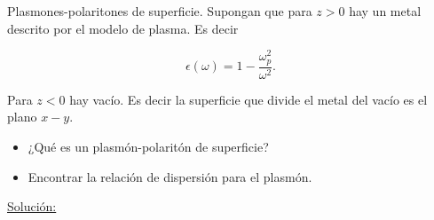 \documentclass[a4paper,11pt]{article}
\numberwithin{equation}{section}
\begin{document}
Plasmones-polaritones de superficie. Supongan que para $z > 0$ hay un metal descrito por el modelo de plasma. Es decir 

$$
\epsilon(\omega) = 1 - \frac{\omega_p^2}{\omega^2}.
$$

Para $z < 0$ hay vacío. Es decir la superficie que divide el metal del vacío es el plano $x - y$.

\begin{itemize}
 \item ¿Qué es un plasmón-polaritón de superficie?
 \item Encontrar la relación de dispersión para el plasmón.
\end{itemize}

\vspace{.3cm}

\underline{Solución:} \vspace{.3cm}
\end{document}
